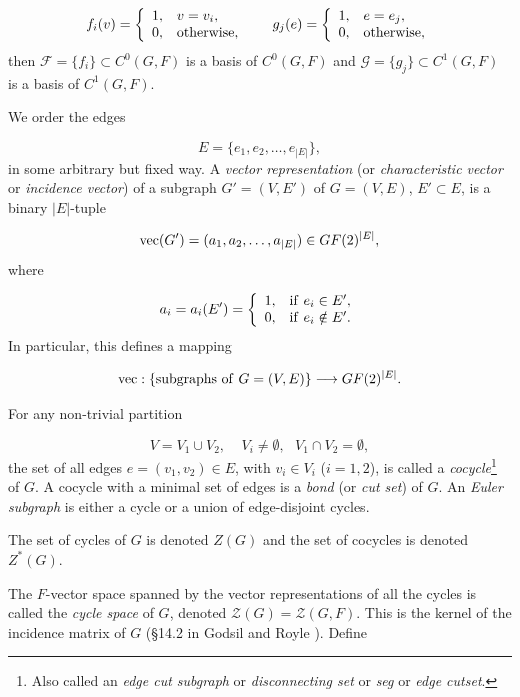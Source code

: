 \[
f_i(v)=
\left\{
\begin{array}{ll}
1,& v = v_i,\\
0, & {\rm otherwise},
\end{array}
\right.
\ \ \ \ \
g_j(e)=
\left\{
\begin{array}{ll}
1,& e = e_j,\\
0, & {\rm otherwise},
\end{array}
\right.
\]
then ${\mathcal F}=\{f_i\}\subset C^0(G,F)$ is a basis
of $ C^0(G,F)$
and ${\mathcal G}=\{g_j\}\subset C^1(G,F)$ is a basis of $C^1(G,F)$.

We order the edges

\[
E = \{e_1,e_2,\dots, e_{|E|}\},
\]
in some arbitrary but fixed way.
A {\it vector representation} (or {\it characteristic vector} or
{\it incidence vector}) of a subgraph $G'=(V,E')$ of $G=(V,E)$,
$E'\subset E$, is a binary ${|E|}$-tuple

\[
{\rm vec}(G')=(a_1,a_2,\dots, a_{|E|}) \in GF(2)^{|E|},
\]
where

\[
a_i=a_i(E')=
\left\{
\begin{array}{ll}
1,&{\rm if \ }e_i\in E',\\
0,&{\rm if \ }e_i\notin E'.
\end{array}
\right.
\]
In particular, this defines a mapping

\[
{\rm vec}:\{ {\rm subgraphs\ of\ }G=(V,E)\}\to GF(2)^{|E|}.
\]


For any non-trivial partition

\[
V = V_1\cup V_2,\ \ \ \ \ V_i\not= \emptyset, \ \ \ V_1\cap V_2= \emptyset,
\]
the set of all edges $e=(v_1,v_2)\in E$, with $v_i\in V_i$ ($i=1,2$),
is called a {\it cocycle}\footnote{Also called an {\it edge cut subgraph}
or {\it disconnecting set} or
{\it seg} or {\it edge cutset}.} of $G$.
A cocycle with a minimal set of edges is a
{\it bond} (or {\it cut set}) of $G$.
An {\it Euler subgraph} is either a cycle
or a union of edge-disjoint cycles.

The set of cycles of $G$ is denoted $Z(G)$ and the set of
cocycles is denoted $Z^*(G)$.

The $F$-vector space spanned by the vector representations of
all the cycles is called the {\it cycle space} of $G$, denoted
${\mathcal Z}(G)={\mathcal Z}(G,F)$.
This is the kernel of the incidence
matrix of $G$ (\S 14.2 in Godsil and Royle \cite{GodsilRoyle2004}).
Define


